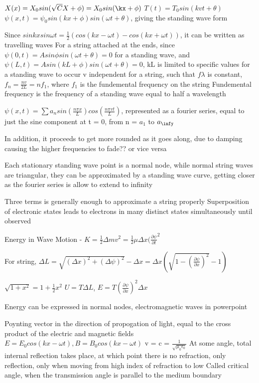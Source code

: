 \documentclass[11 pt, twoside]{article}
\begin{document}
$X(x) = X_0 sin(\sqrt{C}X + \phi) = X_0sin(\kx + \phi)$
$T(t) = T_0 sin(kvt +  \theta)$
$\psi(x, t) = \psi_0 sin(kx + \phi) sin(\omega t + \theta)$, giving the standing wave form

Since $sinkxsin\omega t = \frac{1}{2}(cos(kx - \omega t) - cos(kx + \omega t))$, it can be written as travelling waves
For a string attached at the ends, since $\psi(0, t) = Asin\phi sin(\omega t + \theta) = 0$ for a standing wave, and $\psi(L, t) = Asin(kL + \phi)sin(\omega t + \theta) = 0$, kL is limited to specific values for a standing wave to occur
v independent for a string, such that $f\lambda$ is constant, $f_n = \frac{nv}{2L} = nf_1$, where $f_1$ is the fundemental frequency on the string
Fundemental frequency is the frequency of a standing wave equal to half a wavelength

$\psi(x, t) = \sum a_n sin(\frac{n\pi x}{L})cos(\frac{n\pi vt}{L})$, represented as a fourier series, equal to just the sine component at t = 0, from n = $a_1$ to $a_\infy$

In addition, it proceeds to get more rounded as it goes along, due to damping causing the higher frequencies to fade?? or vice versa

Each stationary standing wave point is a normal node, while normal string waves are triangular, they can be approximated by a standing wave curve, getting closer as the fourier series is allow to extend to infinity

Three terms is generally enough to approximate a string properly
Superposition of electronic states leads to electrons in many distinct states simultaneously until observed

Energy in Wave Motion - $K = \frac{1}{2}\Delta mv^2  = \frac{1}{2} \mu \Delta x (\frac{\partial \psi}{\partial t}^2$

For string, $\Delta L = \sqrt{(\Delta x)^2 + (\Delta \psi)^2} - \Delta x = \Delta x (\sqrt{1 - (\frac{\partial \psi}{\partial x})^2} - 1)$

$\sqrt{1 + x^2} = 1 + \frac{1}{2}x^2$
$U = T\Delta L$, $E = T(\frac{\partial \psi}{\partial x})^2 \Delta x$

Energy can be expressed in normal nodes, electromagnetic waves in powerpoint

Poynting vector in the direction of propogation of light, equal to the cross product of the electric and magnetic fields
$E = E_0 cos(kx - \omega t), B = B_0 cos(kx - \omega t)$
v = c = $\frac{1}{\sqrt{\mu_0 \epsilon_0}}$
At some angle, total internal reflection takes place, at which point there is no refraction, only reflection, only when moving from high index of refraction to low
Called critical angle, when the transmission angle is parallel to the medium boundary
\end{document}
